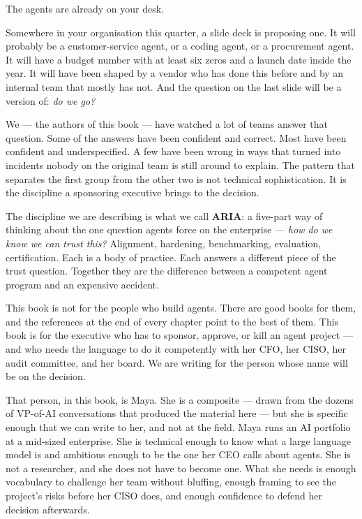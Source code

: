 \label{ch:foreword}

\starttwocol

The agents are already on your desk.

Somewhere in your organisation this quarter, a slide deck is proposing one. It will probably be a customer-service agent, or a coding agent, or a procurement agent. It will have a budget number with at least six zeros and a launch date inside the year. It will have been shaped by a vendor who has done this before and by an internal team that mostly has not. And the question on the last slide will be a version of: \textit{do we go?}

We --- the authors of this book --- have watched a lot of teams answer that question. Some of the answers have been confident and correct. Most have been confident and underspecified. A few have been wrong in ways that turned into incidents nobody on the original team is still around to explain. The pattern that separates the first group from the other two is not technical sophistication. It is the discipline a sponsoring executive brings to the decision.

The discipline we are describing is what we call \textbf{ARIA}: a five-part way of thinking about the one question agents force on the enterprise --- \textit{how do we know we can trust this?} Alignment, hardening, benchmarking, evaluation, certification. Each is a body of practice. Each answers a different piece of the trust question. Together they are the difference between a competent agent program and an expensive accident.

This book is not for the people who build agents. There are good books for them, and the references at the end of every chapter point to the best of them. This book is for the executive who has to sponsor, approve, or kill an agent project --- and who needs the language to do it competently with her CFO, her CISO, her audit committee, and her board. We are writing for the person whose name will be on the decision.

That person, in this book, is Maya. She is a composite --- drawn from the dozens of VP-of-AI conversations that produced the material here --- but she is specific enough that we can write to her, and not at the field. Maya runs an AI portfolio at a mid-sized enterprise. She is technical enough to know what a large language model is and ambitious enough to be the one her CEO calls about agents. She is not a researcher, and she does not have to become one. What she needs is enough vocabulary to challenge her team without bluffing, enough framing to see the project's risks before her CISO does, and enough confidence to defend her decision afterwards.

